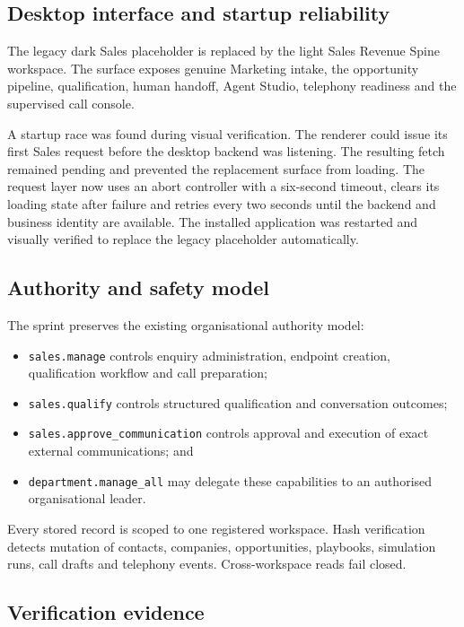 \subsection{Desktop interface and startup reliability}

The legacy dark Sales placeholder is replaced by the light Sales Revenue Spine workspace. The surface exposes genuine Marketing intake, the opportunity pipeline, qualification, human handoff, Agent Studio, telephony readiness and the supervised call console.

A startup race was found during visual verification. The renderer could issue its first Sales request before the desktop backend was listening. The resulting fetch remained pending and prevented the replacement surface from loading. The request layer now uses an abort controller with a six-second timeout, clears its loading state after failure and retries every two seconds until the backend and business identity are available. The installed application was restarted and visually verified to replace the legacy placeholder automatically.

\subsection{Authority and safety model}

The sprint preserves the existing organisational authority model:

\begin{itemize}[leftmargin=*]
    \item \texttt{sales.manage} controls enquiry administration, endpoint creation, qualification workflow and call preparation;
    \item \texttt{sales.qualify} controls structured qualification and conversation outcomes;
    \item \texttt{sales.approve\_communication} controls approval and execution of exact external communications; and
    \item \texttt{department.manage\_all} may delegate these capabilities to an authorised organisational leader.
\end{itemize}

Every stored record is scoped to one registered workspace. Hash verification detects mutation of contacts, companies, opportunities, playbooks, simulation runs, call drafts and telephony events. Cross-workspace reads fail closed.

\subsection{Verification evidence}

